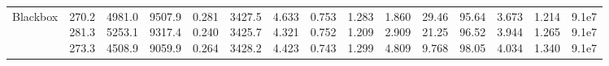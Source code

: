 \begin{landscape}
\begin{table}[t]
{\begin{tabular}{@{}lrrrrrrrrrrrrrr@{}}
Blackbox & \makecell[r]{270.2\\281.3\\273.3} & \makecell[r]{4981.0\\5253.1\\4508.9} & \makecell[r]{9507.9\\9317.4\\9059.9} & \makecell[r]{0.281\\0.240\\0.264} & \makecell[r]{3427.5\\3425.7\\3428.2} & \makecell[r]{4.633\\4.321\\4.423} & \makecell[r]{0.753\\0.752\\0.743} & \makecell[r]{1.283\\1.209\\1.299} & \makecell[r]{1.860\\2.909\\4.809} & \makecell[r]{29.46\\21.25\\9.768} & \makecell[r]{95.64\\96.52\\98.05} & \makecell[r]{3.673\\3.944\\4.034} & \makecell[r]{1.214\\1.265\\1.340} & \makecell[r]{9.1e7\\9.1e7\\9.1e7} \\

\end{tabular}}
\end{table}
\end{landscape}
